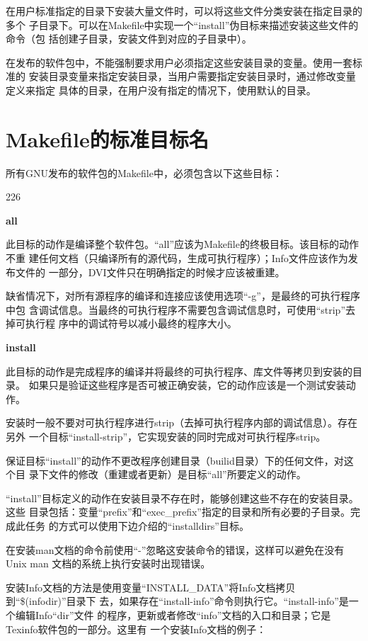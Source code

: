 在用户标准指定的目录下安装大量文件时，可以将这些文件分类安装在指定目录的多个
子目录下。可以在Makefile中实现一个“install”伪目标来描述安装这些文件的命令（包
括创建子目录，安装文件到对应的子目录中）。

在发布的软件包中，不能强制要求用户必须指定这些安装目录的变量。使用一套标准的
安装目录变量来指定安装目录，当用户需要指定安装目录时，通过修改变量定义来指定
具体的目录，在用户没有指定的情况下，使用默认的目录。

\section{Makefile的标准目标名}
所有GNU发布的软件包的Makefile中，必须包含以下这些目标：

\begin{dinglist}{226}
\itemsep=4pt \parskip=2pt

\item \textbf{all}

此目标的动作是编译整个软件包。“all”应该为Makefile的终极目标。该目标的动作不重
建任何文档（只编译所有的源代码，生成可执行程序）；Info文件应该作为发布文件的
一部分，DVI文件只在明确指定的时候才应该被重建。

缺省情况下，对所有源程序的编译和连接应该使用选项“-g”，是最终的可执行程序中包
含调试信息。当最终的可执行程序不需要包含调试信息时，可使用“strip”去掉可执行程
序中的调试符号以减小最终的程序大小。

\item \textbf{install}

此目标的动作是完成程序的编译并将最终的可执行程序、库文件等拷贝到安装的目录。
如果只是验证这些程序是否可被正确安装，它的动作应该是一个测试安装动作。

安装时一般不要对可执行程序进行strip（去掉可执行程序内部的调试信息）。存在另外
一个目标“install-strip”，它实现安装的同时完成对可执行程序strip。

保证目标“install”的动作不更改程序创建目录（builid目录）下的任何文件，对这个目
录下文件的修改（重建或者更新）是目标“all”所要定义的动作。

“install”目标定义的动作在安装目录不存在时，能够创建这些不存在的安装目录。这些
目录包括：变量“prefix”和“exec\_prefix”指定的目录和所有必要的子目录。完成此任务
的方式可以使用下边介绍的“installdirs”目标。

在安装man文档的命令前使用“-”忽略这安装命令的错误，这样可以避免在没有Unix man
文档的系统上执行安装时出现错误。

安装Info文档的方法是使用变量“INSTALL\_DATA”将Info文档拷贝到“\$(infodir)”目录下
去，如果存在“install-info”命令则执行它。“install-info”是一个编辑Info“dir”文件
的程序，更新或者修改“info”文档的入口和目录；它是Texinfo软件包的一部分。这里有
一个安装Info文档的例子：


\end{dinglist}
